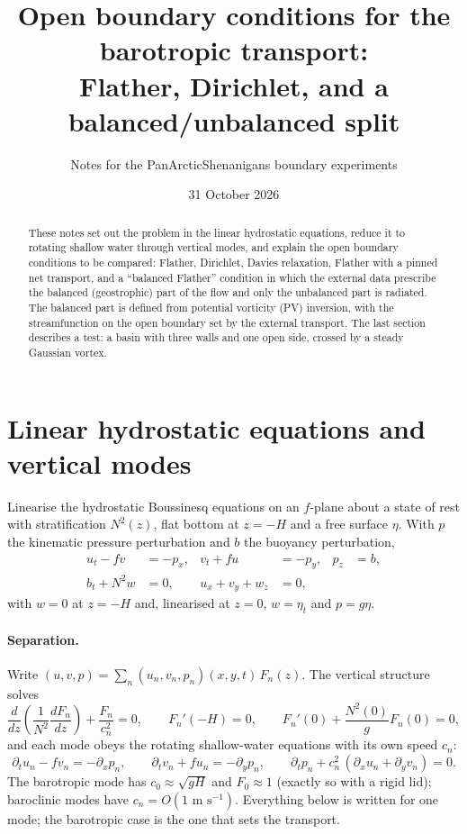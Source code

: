 \documentclass[11pt]{article}
\title{Open boundary conditions for the barotropic transport:\\
Flather, Dirichlet, and a balanced/unbalanced split}
\author{Notes for the PanArcticShenanigans boundary experiments}
\date{31 October 2026}
\begin{document}
\maketitle

\begin{abstract}
These notes set out the problem in the linear hydrostatic equations, reduce it to rotating shallow water through
vertical modes, and explain the open boundary conditions to be compared: Flather, Dirichlet, Davies relaxation,
Flather with a pinned net transport, and a ``balanced Flather'' condition in which the external data prescribe the
balanced (geostrophic) part of the flow and only the unbalanced part is radiated. The balanced part is defined
from potential vorticity (PV) inversion, with the streamfunction on the open boundary set by the external
transport. The last section describes a test: a basin with three walls and one open side, crossed by a steady
Gaussian vortex.
\end{abstract}

\section{Linear hydrostatic equations and vertical modes}

Linearise the hydrostatic Boussinesq equations on an $f$-plane about a state of rest with stratification
$N^2(z)$, flat bottom at $z=-H$ and a free surface $\eta$. With $p$ the kinematic pressure perturbation and $b$ the
buoyancy perturbation,
\begin{align}
  u_t - f v &= -p_x, & v_t + f u &= -p_y, & p_z &= b, \\
  b_t + N^2 w &= 0,  & u_x + v_y + w_z &= 0, &&
\end{align}
with $w=0$ at $z=-H$ and, linearised at $z=0$, $w=\eta_t$ and $p=g\eta$.

\paragraph{Separation.} Write $(u,v,p) = \sum_n (u_n,v_n,p_n)(x,y,t)\,F_n(z)$. The vertical structure solves
\begin{equation}
  \frac{d}{dz}\!\left(\frac{1}{N^2}\frac{dF_n}{dz}\right) + \frac{F_n}{c_n^2} = 0,\qquad
  F_n'(-H) = 0,\qquad F_n'(0) + \frac{N^2(0)}{g}F_n(0) = 0,
  \label{eq:sturm}
\end{equation}
and each mode obeys the rotating shallow-water equations with its own speed $c_n$:
\begin{equation}
  \partial_t u_n - f v_n = -\partial_x p_n,\qquad
  \partial_t v_n + f u_n = -\partial_y p_n,\qquad
  \partial_t p_n + c_n^2\,(\partial_x u_n + \partial_y v_n) = 0.
  \label{eq:swmode}
\end{equation}
The barotropic mode has $c_0\approx\sqrt{gH}$ and $F_0\approx 1$ (exactly so with a rigid lid); baroclinic modes
have $c_n = O(1\text{ m s}^{-1})$. Everything below is written for one mode; the barotropic case is the one that
sets the transport.
\end{document}
